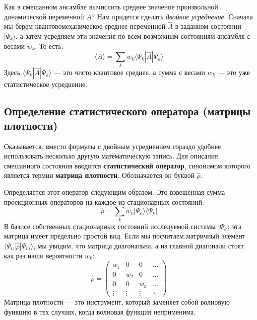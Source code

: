 \documentclass[../general/general]{subfiles}
\begin{document}
Как в смешанном ансамбле вычислить среднее значение произвольной динамической переменной $A$? Нам придется сделать \textit{двойное усреднение}. Сначала мы берем квантовомеханическое среднее переменной $\hat{A}$ в заданном состоянии $|\Psi_k\rangle$, а затем усредняем эти значения по всем возможным состояниям ансамбля с весами $w_k$. То есть:
\begin{equation}
    \langle A \rangle = \sum_k w_k \langle \Psi_k | \hat{A} | \Psi_k \rangle
\end{equation}
Здесь $\langle \Psi_k | \hat{A} | \Psi_k \rangle$ — это чисто квантовое среднее, а сумма с весами $w_k$ — это уже статистическое усреднение.

\subsection{Определение статистического оператора (матрицы плотности)}

Оказывается, вместо формулы с двойным усреднением гораздо удобнее использовать несколько другую математическую запись. Для описания смешанного состояния вводится \textbf{статистический оператор}, синонимом которого является термин \textbf{матрица плотности}. Обозначается он буквой $\hat{\rho}$.

Определяется этот оператор следующим образом. Это взвешенная сумма проекционных операторов на каждое из стационарных состояний:
\begin{equation}
    \hat{\rho} = \sum_k w_k |\Psi_k\rangle \langle \Psi_k | \label{eq:density_matrix_def}
\end{equation}
В базисе собственных стационарных состояний исследуемой системы $|\Psi_{k}\rangle$ эта матрица имеет предельно простой вид. Если мы посчитаем матричный элемент $\langle \Psi_n | \hat{\rho} | \Psi_m \rangle$, мы увидим, что матрица диагональна, а на главной диагонали стоят как раз наши вероятности $w_k$:
\begin{equation}
    \hat{\rho} = 
    \begin{pmatrix}
        w_1 & 0 & 0 & \dots \\
        0 & w_2 & 0 & \dots \\
        0 & 0 & w_3 & \dots \\
        \vdots & \vdots & \vdots & \ddots
    \end{pmatrix}
\end{equation}
Матрица плотности — это инструмент, который заменяет собой волновую функцию в тех случаях, когда волновая функция неприменима.
\end{document}
